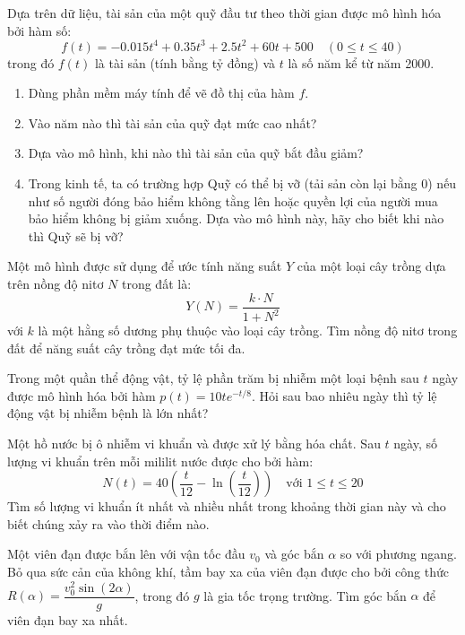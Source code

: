 \begin{exercise}
Dựa trên dữ liệu, tài sản của một quỹ đầu tư theo thời gian được mô hình hóa bởi hàm số:
$$ f(t) = -0.015t^4 + 0.35t^3 + 2.5t^2 + 60t + 500 \quad (0 \le t \le 40) $$
trong đó $f(t)$ là tài sản (tính bằng tỷ đồng) và $t$ là số năm kể từ năm 2000.
\begin{enumerate}[label=(\alph*)]
    \item Dùng phần mềm máy tính để vẽ đồ thị của hàm $f$.
    \item Vào năm nào thì tài sản của quỹ đạt mức cao nhất?
    \item Dựa vào mô hình, khi nào thì tài sản của quỹ bắt đầu giảm?
    \item Trong kinh tế, ta có trường hợp Quỹ có thể bị vỡ (tải sản còn lại bằng 0) nếu như số người đóng bảo hiểm không tằng lên hoặc quyền lợi của người mua bảo hiểm không bị giảm xuống. Dựa vào mô hình này, hãy cho biết khi nào thì Quỹ sẽ bị vỡ?
\end{enumerate}
\end{exercise}

\begin{exercise}
Một mô hình được sử dụng để ước tính năng suất $Y$ của một loại cây trồng dựa trên nồng độ nitơ $N$ trong đất là:
$$ Y(N) = \dfrac{k \cdot N}{1 + N^2} $$
với $k$ là một hằng số dương phụ thuộc vào loại cây trồng. Tìm nồng độ nitơ trong đất để năng suất cây trồng đạt mức tối đa.
\end{exercise}

\begin{exercise}
Trong một quần thể động vật, tỷ lệ phần trăm bị nhiễm một loại bệnh sau $t$ ngày được mô hình hóa bởi hàm $p(t) = 10te^{-t/8}$. Hỏi sau bao nhiêu ngày thì tỷ lệ động vật bị nhiễm bệnh là lớn nhất?
\end{exercise}

\begin{exercise}
Một hồ nước bị ô nhiễm vi khuẩn và được xử lý bằng hóa chất. Sau $t$ ngày, số lượng vi khuẩn trên mỗi mililit nước được cho bởi hàm:
$$ N(t) = 40 \left( \dfrac{t}{12} - \ln\left(\dfrac{t}{12}\right) \right) \quad \text{với } 1 \le t \le 20 $$
Tìm số lượng vi khuẩn ít nhất và nhiều nhất trong khoảng thời gian này và cho biết chúng xảy ra vào thời điểm nào.
\end{exercise}

\begin{exercise}
Một viên đạn được bắn lên với vận tốc đầu $v_0$ và góc bắn $\alpha$ so với phương ngang. Bỏ qua sức cản của không khí, tầm bay xa của viên đạn được cho bởi công thức $R(\alpha) = \dfrac{v_0^2 \sin(2\alpha)}{g}$, trong đó $g$ là gia tốc trọng trường. Tìm góc bắn $\alpha$ để viên đạn bay xa nhất.
\end{exercise}

